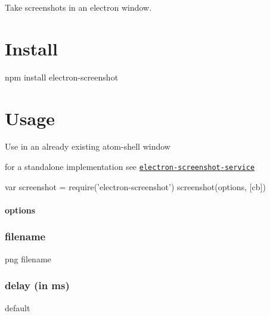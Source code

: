 \href{https://github.com/feross/standard}{\tt } \href{https://greenkeeper.io/}{\tt }

Take screenshots in an electron window.

\section*{Install}

npm install electron-\/screenshot

\section*{Usage}

Use in an already existing atom-\/shell window

for a standalone implementation see \href{https://github.com/FWeinb/electron-screenshot-service}{\tt electron-\/screenshot-\/service}


\begin{DoxyCode}
var screenshot = require('electron-screenshot')
screenshot(options, [cb])
\end{DoxyCode}


\paragraph*{options}

\subsubsection*{filename}

png filename

\subsubsection*{delay (in ms)}

default {} 